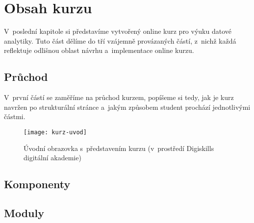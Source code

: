 \hypertarget{obsah-kurzu}{%
\chapter{Obsah kurzu}\label{obsah-kurzu}}

V~poslední kapitole si představíme vytvořený online kurz pro výuku datové analytiky. Tuto část dělíme do tří vzájemně provázaných částí, z~nichž každá reflektuje odlišnou oblast návrhu a~implementace online kurzu.

\hypertarget{prux16fchod}{%
\section{Průchod}\label{prux16fchod}}

V~první částí se zaměříme na průchod kurzem, popíšeme si tedy, jak je kurz navržen po strukturální stránce a~jakým způsobem student prochází jednotlivými částmi.

\begin{figure}[ht]   
    \centering
    \texttt{[image: kurz-uvod]}  
    \caption{Úvodní obrazovka s~představením kurzu (v~prostředí Digiskills digitální akademie)}
    \label{kurz-uvod}
\end{figure}

\hypertarget{komponenty}{%
\section{Komponenty}\label{komponenty}}

\hypertarget{moduly}{%
\section{Moduly}\label{moduly}}
